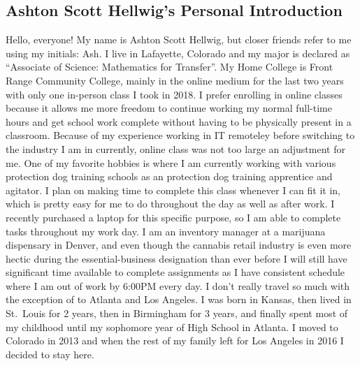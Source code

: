 \documentclass[stu,12pt]{apa7}
\begin{document}
    \newpage
    \subsection{Ashton Scott Hellwig's Personal Introduction}
      Hello, everyone! My name is Ashton Scott Hellwig, but closer friends refer
        to me using my initials: Ash. I live in Lafayette, Colorado and my major
        is declared as ``Associate of Science: Mathematics for Transfer''. My
        Home College is Front Range Community College, mainly in the online
        medium for the last two years with only one in-person class I took in
        2018. I prefer enrolling in online classes because it allows me more
        freedom to continue working my normal full-time hours and get school
        work complete without having to be physically present in a classroom.
        Because of my experience working in IT remoteley before switching to
        the industry I am in currently, online class was not too large an
        adjustment for me. One of my favorite hobbies is where I am currently
        working with various protection dog training schools as an protection
        dog training apprentice and agitator.
        I plan on making time to complete this class whenever I can fit it in,
        which is pretty easy for me to do throughout the day as well as after
        work. I recently purchased a laptop for this specific purpose, so I am
        able to complete tasks throughout my work day. I am an inventory manager
        at a marijuana dispensary in Denver, and even though the cannabis
        retail industry is even more hectic during the essential-business
        designation than ever before I will still have significant time
        available to complete assignments as I have consistent schedule where I
        am out of work by 6:00PM every day. I don't really travel so much with
        the exception of to Atlanta and Los Angeles. I was born in Kansas, then
        lived in St.\ Louis for 2 years, then in Birmingham for 3 years, and
        finally spent most of my childhood until my sophomore year of High
        School in Atlanta. I moved to Colorado in 2013 and when the rest of my
        family left for Los Angeles in 2016 I decided to stay here.


\end{document}
